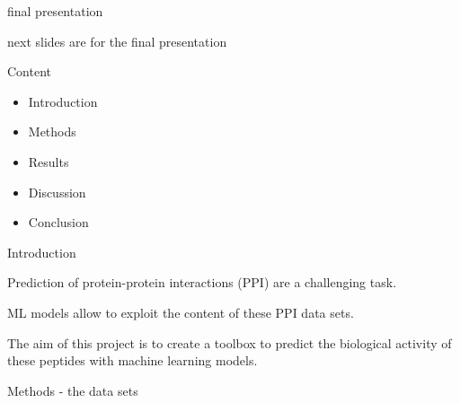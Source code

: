 \documentclass[ignorenonframetext,]{beamer}
\providecommand{\tightlist}{%
  \setlength{\itemsep}{0pt}\setlength{\parskip}{0pt}}
\begin{document}
\begin{frame}{final presentation}
\protect\hypertarget{final-presentation}{}

next slides are for the final presentation

\begin{block}{Content}

\begin{itemize}
\tightlist
\item
  Introduction
\item
  Methods
\item
  Results
\item
  Discussion
\item
  Conclusion
\end{itemize}

\end{block}

\begin{block}{Introduction}

Prediction of protein-protein interactions (PPI) are a challenging task.

ML models allow to exploit the content of these PPI data sets.

The aim of this project is to create a toolbox to predict the biological
activity of these peptides with machine learning models.

\end{block}

\begin{block}{Methods - the data sets}


\end{block}
\end{frame}
\end{document}
